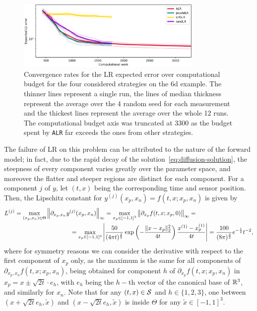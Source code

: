 \begin{figure}[H]
\begin{center}
    \includegraphics[width=0.8\textwidth]{results/pictures/d6/LR_res.png}
\end{center}
\caption{Convergence rates for the LR expected error over computational budget for the four considered strategies on the 6d example. The thinner lines represent a single run, the lines of median thickness represent the average over the 4 random seed for each measurement and the thickest lines represent the average over the whole 12 runs. The computational budget axis was truncated at 3300 as the budget spent by \texttt{ALR} far exceeds the ones from other strategies. }
    \label{fig:6dLRconv}
\end{figure}


The failure of LR on this problem can be attributed to the nature of the forward model; in fact, due to the rapid decay of the solution~\eqref{eq:diffusion-solution}, the steepness of every component varies greatly over the parameter space, and moreover the flatter and steeper regions are distinct for each component.
For a component $j$ of $y$, let $(t,x)$ being the corresponding time and sensor position.
Then, the Lipschitz constant for $y^{(j)}(x_p,x_n) = f(t,x;x_p,x_n)$ is given by 
\begin{align*}
    L^{(j)} = \max_{(x_p,x_n)\in\Theta}& \left\| \partial_{x_p,  x_n} y^{(j)}(x_p,x_n) \right\|_\infty  =
    \max_{x_p\in[-1,1]^3} \left\| \partial_{x_p} f(t,x;x_p,0) \right\|_\infty  =\\
    &\qquad \qquad= \max_{x_p\in [-1,1]^3} \left| \frac{50}{(4 \pi t)^{\frac{3}{2}}}\exp \left( - \frac{\lVert x-x_p\rVert_2^2}{4t}\right) \frac{x^{(1)}-x_p^{(1)}}{4t} \right| 
    = \frac{100}{(8\pi)^{\frac{3}{2}}} e^{-\frac{1}{2}} t^{-2},
\end{align*}
where for symmetry reasons we can consider the derivative with respect to the first component of $x_p$ only, as the maximum is the same for all components of $\partial_{x_p, x_n} f(t,x;x_p,x_n)$, being obtained for component $h$ of $\partial_{x_p} f(t,x;x_p,x_n)$ in $x_p = x \pm \sqrt{2t} \cdot e_h$, with $e_h$ being the $h-$th vector of the canonical base of $\mathbb{R}^3$, and similarly for $x_n$.
Note that for any $(t,x) \in \mathcal S$ and $h \in \{1,2,3\}$, one between $(x + \sqrt{2t} e_h, \tilde x)$ and $(x - \sqrt{2t} e_h, \tilde x)$ is inside $\Theta$ for any $\tilde x \in [-1,1]^3$.

